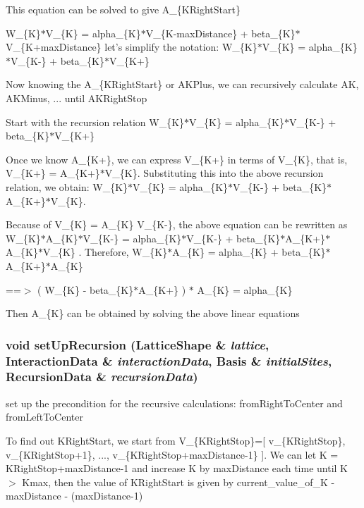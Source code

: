 This equation can be solved to give A\_\-\{KRight\-Start\}

W\_\-\{K\}$\ast$V\_\-\{K\} = alpha\_\-\{K\}$\ast$V\_\-\{K-max\-Distance\} + beta\_\-\{K\}$\ast$V\_\-\{K+max\-Distance\} let's simplify the notation: W\_\-\{K\}$\ast$V\_\-\{K\} = alpha\_\-\{K\}$\ast$V\_\-\{K-\} + beta\_\-\{K\}$\ast$V\_\-\{K+\}

Now knowing the A\_\-\{KRight\-Start\} or AKPlus, we can recursively calculate AK, AKMinus, ... until AKRight\-Stop

Start with the recursion relation W\_\-\{K\}$\ast$V\_\-\{K\} = alpha\_\-\{K\}$\ast$V\_\-\{K-\} + beta\_\-\{K\}$\ast$V\_\-\{K+\}

Once we know A\_\-\{K+\}, we can express V\_\-\{K+\} in terms of V\_\-\{K\}, that is, V\_\-\{K+\} = A\_\-\{K+\}$\ast$V\_\-\{K\}. Substituting this into the above recursion relation, we obtain: W\_\-\{K\}$\ast$V\_\-\{K\} = alpha\_\-\{K\}$\ast$V\_\-\{K-\} + beta\_\-\{K\}$\ast$A\_\-\{K+\}$\ast$V\_\-\{K\}.

Because of V\_\-\{K\} = A\_\-\{K\} V\_\-\{K-\}, the above equation can be rewritten as W\_\-\{K\}$\ast$A\_\-\{K\}$\ast$V\_\-\{K-\} = alpha\_\-\{K\}$\ast$V\_\-\{K-\} + beta\_\-\{K\}$\ast$A\_\-\{K+\}$\ast$A\_\-\{K\}$\ast$V\_\-\{K\} . Therefore, W\_\-\{K\}$\ast$A\_\-\{K\} = alpha\_\-\{K\} + beta\_\-\{K\}$\ast$A\_\-\{K+\}$\ast$A\_\-\{K\}

==$>$ ( W\_\-\{K\} - beta\_\-\{K\}$\ast$A\_\-\{K+\} ) $\ast$ A\_\-\{K\} = alpha\_\-\{K\}

Then A\_\-\{K\} can be obtained by solving the above linear equations 
\subsubsection{\setlength{\rightskip}{0pt plus 5cm}void set\-Up\-Recursion (\bf{Lattice\-Shape} \& {\em lattice}, \bf{Interaction\-Data} \& {\em interaction\-Data}, \bf{Basis} \& {\em initial\-Sites}, \bf{Recursion\-Data} \& {\em recursion\-Data})}\label{recursiveCalculation_8h_cfed0b2a759fecb4de581223ec6b5a29}


set up the precondition for the recursive calculations: from\-Right\-To\-Center and from\-Left\-To\-Center 

To find out KRight\-Start, we start from V\_\-\{KRight\-Stop\}=[ v\_\-\{KRight\-Stop\}, v\_\-\{KRight\-Stop+1\}, ..., v\_\-\{KRight\-Stop+max\-Distance-1\} ]. We can let K = KRight\-Stop+max\-Distance-1 and increase K by max\-Distance each time until K $>$ Kmax, then the value of KRight\-Start is given by current\_\-value\_\-of\_\-K - max\-Distance - (max\-Distance-1) 

